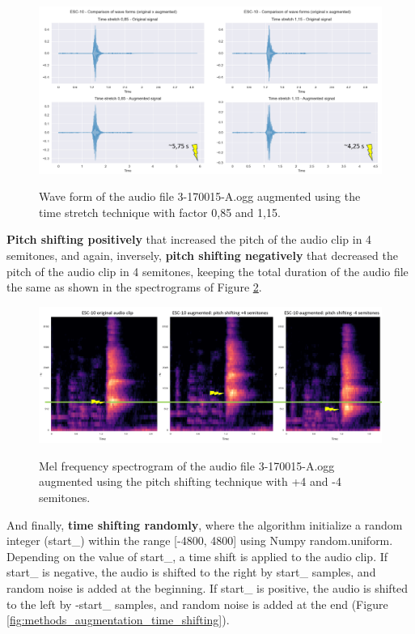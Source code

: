\begin{figure}[htbp]
    \raggedright
        \caption{Wave form of the audio file 3-170015-A.ogg augmented using the time stretch technique with factor 0,85 and 1,15.}
        \includegraphics[width=1\textwidth]{resources/images/050-methods/Methods_augmentation_time_stretching.png}
        \label{fig:methods_augmentation_time_stretch}
\end{figure}

\textbf{Pitch shifting positively} that increased the pitch of the audio clip in 4 semitones, and again, inversely, \textbf{pitch shifting negatively} that decreased the pitch of the audio clip in 4 semitones, keeping the total duration of the audio file the same as shown in the spectrograms of Figure \ref{fig:methods_augmentation_pitch_shifting}. 

\begin{figure}[htbp]
    \raggedright
        \caption{Mel frequency spectrogram of the audio file 3-170015-A.ogg augmented using the pitch shifting technique with +4 and -4 semitones.}
        \includegraphics[width=1\textwidth]{resources/images/050-methods/Methods_augmentation_pitch_shifting.png}
        \label{fig:methods_augmentation_pitch_shifting}
\end{figure}

And finally, \textbf{time shifting randomly}, where the algorithm initialize a random integer (start\_) within the range [-4800, 4800] using Numpy random.uniform. Depending on the value of start\_, a time shift is applied to the audio clip. If start\_ is negative, the audio is shifted to the right by start\_ samples, and random noise is added at the beginning. If start\_ is positive, the audio is shifted to the left by -start\_ samples, and random noise is added at the end (Figure \ref{fig:methods_augmentation_time_shifting}).

